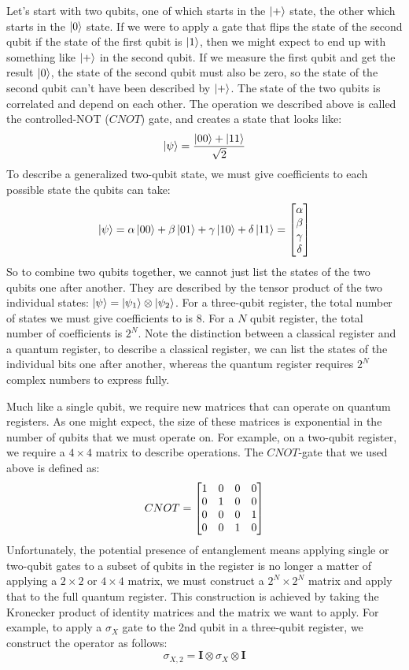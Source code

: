 Let's start with two qubits, one of which starts in the $\ket{+}$ state, the other which starts in
the $\ket{0}$ state. If we were to apply a gate that flips the state of the second qubit if the state of
the first qubit is $\ket{1}$, then we might expect to end up with something like $\ket{+}$ in the second
qubit. If we measure the first qubit and get the result $\ket{0}$, the state of the second qubit must also
be zero, so the state of the second qubit can't have been described by $\ket{+}$. The state of the two
qubits is correlated and depend on each other. The operation we described above is called the
controlled-NOT ($CNOT$) gate, and creates a state that looks like:
\begin{equation}
  \ket{\psi} = \frac{\ket{00} + \ket{11}}{\sqrt{2}}
\end{equation}
To describe a generalized two-qubit state, we must give coefficients to each possible state the qubits
can take:
\begin{equation}
  \ket{\psi} = \alpha\ket{00} + \beta\ket{01} + \gamma\ket{10} + \delta\ket{11} =
    \begin{bmatrix}\alpha\\\beta\\\gamma\\\delta\end{bmatrix}
\end{equation}
So to combine two qubits together, we cannot just list the states of the two qubits one after another.
They are described by the tensor product of the two individual states: $\ket{\psi} = \ket{\psi_1}\otimes\ket{\psi_2}$.
For a three-qubit register, the total number of states we must give coefficients to is 8. For a $N$ qubit
register, the total number of coefficients is $2^N$. Note the distinction between a classical register
and a quantum register, to describe a classical register, we can list the states of the individual
bits one after another, whereas the quantum register requires $2^N$ complex numbers to express fully.

Much like a single qubit, we require new matrices that can operate on quantum registers. As one
might expect, the size of these matrices is exponential in the number of qubits that we must operate on.
For example, on a two-qubit register, we require a $4 \times 4$ matrix to describe operations. The
$CNOT$-gate that we used above is defined as:
\begin{equation}
  CNOT = \begin{bmatrix}1&0&0&0\\0&1&0&0\\0&0&0&1\\0&0&1&0\end{bmatrix}
\end{equation}
Unfortunately, the potential presence of entanglement means applying single or two-qubit gates to a subset
of qubits in the register is no longer a matter of applying a $2 \times 2$ or $4 \times 4$ matrix, we must
construct a $2^N \times 2^N$ matrix and apply that to the full quantum register. This construction is achieved
by taking the Kronecker product of identity matrices and the matrix we want to apply. For example, to apply
a $\sigma_X$ gate to the 2nd qubit in a three-qubit register, we construct the operator as follows:
\begin{equation}
  \sigma_{X,2} = \boldsymbol{I} \otimes \sigma_X \otimes \boldsymbol{I}
\end{equation}

